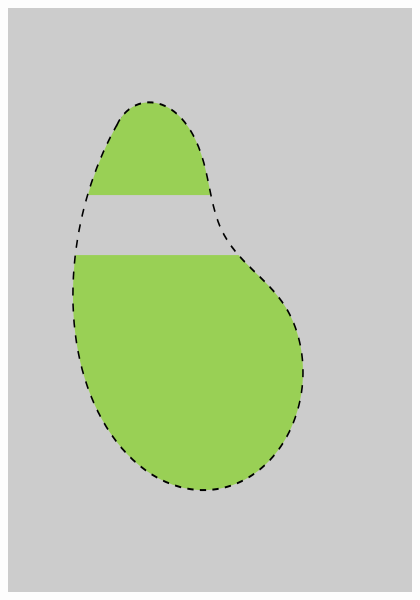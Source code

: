 \begin{frame}
\begin{minipage}[t][0.7\textheight][t]{1\textwidth}
{\includegraphics[scale=0.5]{figures/non-submodular-elastica/completion/completion-2.png}
}%
%
\vspace{1em}


\end{minipage}
\end{frame}
